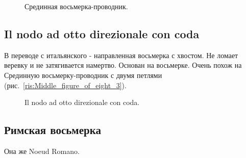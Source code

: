 \begin{figure}[H]\centering
	\caption{Срединная восьмерка-проводник.}\label{ris:Middle_figure_of_eight}
\end{figure}

\subsection{Il nodo ad otto direzionale con coda}

В переводе с итальянского - направленная восьмерка с хвостом. Не ломает веревку и не затягивается намертво. Основан на восьмерке. Очень похож на Срединную восьмерку-проводник с двумя петлями (рис.~\ref{ris:Middle_figure_of_eight_3}).

\begin{figure}[H]\centering
\end{figure}

\begin{figure}[H]\centering
	\caption{Il nodo ad otto direzionale con coda.}\label{ris:Il_nodo_ad_otto_direzionale_con_coda}
\end{figure}

\subsection{Римская восьмерка}

Она же Noeud Romano.

\begin{figure}[H]\centering
	\subfloat[Завязывание]{\label{ris:Rome_figure_of_eight_1}
	\tcbox[enhanced jigsaw,colframe=black,opacityframe=0.5,opacityback=0.5]
		{\centering
			}
		}
\end{figure}

